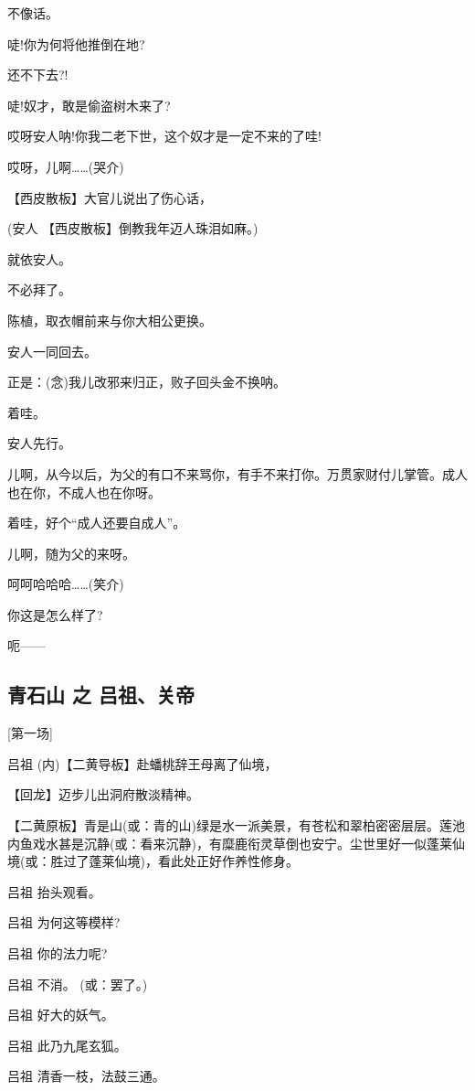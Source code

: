 不像话。

唗!你为何将他推倒在地?

还不下去?!

唗!奴才，敢是偷盗树木来了?

哎呀安人呐!你我二老下世，这个奴才是一定不来的了哇!

哎呀，儿啊\ldots{}\ldots{}(哭介)

【西皮散板】大官儿说出了伤心话，

(安人 【西皮散板】倒教我年迈人珠泪如麻。)

就依安人。

不必拜了。

陈植，取衣帽前来与你大相公更换。

安人一同回去。

正是：(念)我儿改邪来归正，败子回头金不换呐。

着哇。

安人先行。

儿啊，从今以后，为父的有口不来骂你，有手不来打你。万贯家财付儿掌管。成人也在你，不成人也在你呀。

着哇，好个``成人还要自成人''。

儿啊，随为父的来呀。

呵呵哈哈哈\ldots{}\ldots{}(笑介)

你这是怎么样了?

呃------

\hypertarget{ux9752ux77f3ux5c71-ux4e4b-ux5415ux7956ux5173ux5e1d}{%
\subsection{青石山 之
吕祖、关帝}\label{ux9752ux77f3ux5c71-ux4e4b-ux5415ux7956ux5173ux5e1d}}

{[}第一场{]}

吕祖 (内)【二黄导板】赴蟠桃辞王母离了仙境，

【回龙】迈步儿出洞府散淡精神。

【二黄原板】青是山(或：青的山)绿是水一派美景，有苍松和翠柏密密层层。莲池内鱼戏水甚是沉静(或：看来沉静)，有糜鹿衔灵草倒也安宁。尘世里好一似蓬莱仙境(或：胜过了蓬莱仙境)，看此处正好作养性修身。

吕祖 抬头观看。

吕祖 为何这等模样?

吕祖 你的法力呢?

吕祖 不消。 (或：罢了。)

吕祖 好大的妖气。

吕祖 此乃九尾玄狐。

吕祖 清香一枝，法鼓三通。

